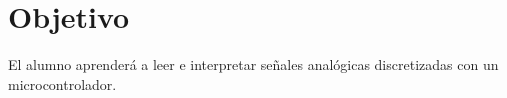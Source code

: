 %
%

\section{Objetivo}%
\label{sec:objective}
El alumno aprenderá a leer e interpretar señales analógicas discretizadas con un microcontrolador.
